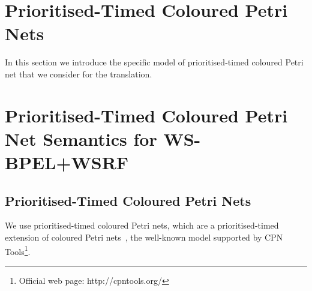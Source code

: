 \section{Prioritised-Timed Coloured Petri Nets}\label{petrinet}

In this section we introduce the specific model of prioritised-timed
coloured Petri net that we consider for the translation. 
\section{Prioritised-Timed Coloured Petri Net Semantics for WS-BPEL+WSRF}\label{semantics}

\subsection{Prioritised-Timed Coloured Petri Nets}

We use prioritised-timed coloured Petri nets, 
which are
a prioritised-timed extension of coloured Petri nets~\cite{Jensen2009},
the well-known model supported by CPN Tools\footnote{Official web page: http://cpntools.org/}.

